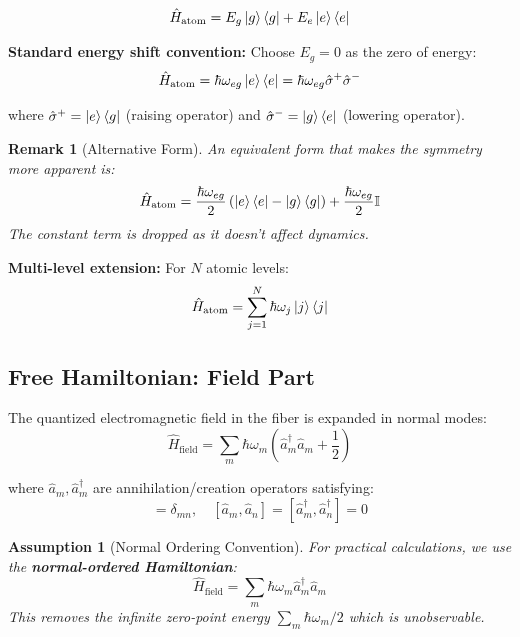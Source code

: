 \documentclass[12pt,a4paper]{article}
\newtheorem{remark}{Remark}
\newtheorem{assumption}{Assumption}
\begin{document}
\begin{equation}
\hat{H}_{\text{atom}} = E_g \ket{g}\bra{g} + E_e \ket{e}\bra{e} \label{eq:atom_ham_full}
\end{equation}

\textbf{Standard energy shift convention:} Choose $E_g = 0$ as the zero of energy:
\begin{equation}
\hat{H}_{\text{atom}} = \hbar\omega_{eg} \ket{e}\bra{e} = \hbar\omega_{eg} \hat{\sigma}^+ \hat{\sigma}^- \label{eq:atom_ham}
\end{equation}

where $\hat{\sigma}^+ = \ket{e}\bra{g}$ (raising operator) and $\hat{\sigma}^- = \ket{g}\bra{e}$ (lowering operator).

\begin{remark}[Alternative Form]
An equivalent form that makes the symmetry more apparent is:
\begin{equation}
\hat{H}_{\text{atom}} = \frac{\hbar\omega_{eg}}{2}\left(\ket{e}\bra{e} - \ket{g}\bra{g}\right) + \frac{\hbar\omega_{eg}}{2}\mathbb{I}
\end{equation}
The constant term is dropped as it doesn't affect dynamics.
\end{remark}

\textbf{Multi-level extension:} For $N$ atomic levels:
\begin{equation}
\hat{H}_{\text{atom}} = \sum_{j=1}^{N} \hbar\omega_j \ket{j}\bra{j}
\end{equation}

\subsection{Free Hamiltonian: Field Part}

The quantized electromagnetic field in the fiber is expanded in normal modes:
\begin{equation}
\hat{H}_{\text{field}} = \sum_m \hbar\omega_m \left(\hat{a}_m^\dagger \hat{a}_m + \frac{1}{2}\right) \label{eq:field_ham_raw}
\end{equation}

where $\hat{a}_m, \hat{a}_m^\dagger$ are annihilation/creation operators satisfying:
\begin{equation}
[\hat{a}_m, \hat{a}_n^\dagger] = \delta_{mn}, \quad [\hat{a}_m, \hat{a}_n] = [\hat{a}_m^\dagger, \hat{a}_n^\dagger] = 0
\end{equation}

\begin{assumption}[Normal Ordering Convention]
For practical calculations, we use the \textbf{normal-ordered Hamiltonian}:
\begin{equation}
\hat{H}_{\text{field}} = \sum_m \hbar\omega_m \hat{a}_m^\dagger \hat{a}_m \label{eq:field_ham}
\end{equation}
This removes the infinite zero-point energy $\sum_m \hbar\omega_m/2$ which is unobservable.
\end{assumption}
\end{document}
